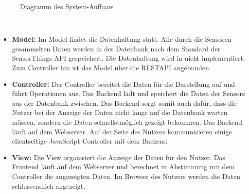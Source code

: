 \begin{figure}
    \caption{Diagramm des System-Aufbaus}
\end{figure}
\\
\begin{itemize}
    \item \textbf{Model:} Im Model findet die Datenhaltung statt. Alle durch die Sensoren gesammelten Daten werden in der Datenbank nach dem Standard der \gls{SensorThings API} gespeichert. Die Datenhaltung wird in \softwarename nicht implementiert.
        Zum Controller hin ist das Model über die \gls{RESTAPI} angebunden.
    \item \textbf{Controller:} Der Controller bereitet die Daten für die Darstellung auf und führt Operationen aus.
        Das \softwarename Backend lädt und speichert die Daten der \glspl{Sensor} aus der Datenbank zwischen. Das Backend sorgt somit auch dafür, dass die Nutzer bei der Anzeige der Daten nicht lange auf die Datenbank warten müssen, sondern die Daten schnellstmöglich gezeigt bekommen.
        Das \softwarename Backend läuft auf dem Webserver. Auf der Seite des Nutzers kommunizieren einige clientseitige \gls{JavaScript} Controller mit dem Backend.
    \item \textbf{View:} Die View organisiert die Anzeige der Daten für den Nutzer.
        Das \softwarename Frontend läuft auf dem Webserver und berechnet in Abstimmung mit dem Controller die angezeigten Daten.
        Im Browser des Nutzers werden die Daten schlussendlich angezeigt.
\end{itemize}
